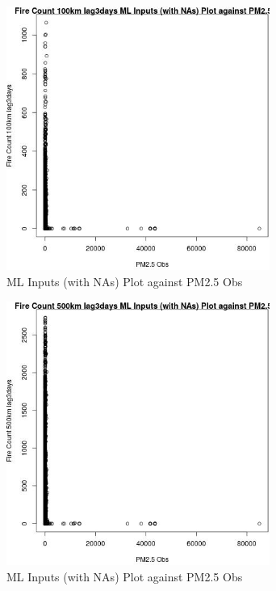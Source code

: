 \begin{figure} 
\centering  
\includegraphics[width=0.77\textwidth]{Code_Outputs/Report_ML_input_PM25_Step4_part_f_de_duplicated_aves_prioritize_24hr_obswNAs_Fire_Count_100km_lag3daysvPM25_Obs.jpg} 
\caption{\label{fig:Report_ML_input_PM25_Step4_part_f_de_duplicated_aves_prioritize_24hr_obswNAsFire_Count_100km_lag3daysvPM25_Obs}ML Inputs (with NAs) Plot against PM2.5 Obs} 
\end{figure} 
 

\begin{figure} 
\centering  
\includegraphics[width=0.77\textwidth]{Code_Outputs/Report_ML_input_PM25_Step4_part_f_de_duplicated_aves_prioritize_24hr_obswNAs_Fire_Count_500km_lag3daysvPM25_Obs.jpg} 
\caption{\label{fig:Report_ML_input_PM25_Step4_part_f_de_duplicated_aves_prioritize_24hr_obswNAsFire_Count_500km_lag3daysvPM25_Obs}ML Inputs (with NAs) Plot against PM2.5 Obs} 
\end{figure} 
 

